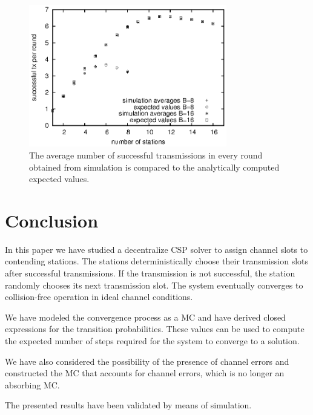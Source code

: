 \documentclass[journal]{IEEEtran}
\begin{document}
\begin{figure}[h]
\centering
\includegraphics[height=6.2cm]{figures/successful_tx_per_step}
\caption{The average number of successful transmissions in every round obtained from simulation is compared to the analytically computed expected values.}
\label{fig:successful_tx_per_step}
\end{figure}

\section{Conclusion}
\label{sec:conclusion}

In this paper we have studied a decentralize CSP solver to assign channel slots to contending stations.
The stations deterministically choose their transmission slots after successful transmissions.
If the transmission is not successful, the station randomly chooses its next transmission slot.
The system eventually converges to collision-free operation in ideal channel conditions.

We have modeled the convergence process as a MC and have derived closed expressions for the transition probabilities.
These values can be used to compute the expected number of steps required for the system to converge to a solution.

We have also considered the possibility of the presence of channel errors and constructed the MC that accounts for channel errors, which is no longer an absorbing MC.

The presented results have been validated by means of simulation.





\end{document}
